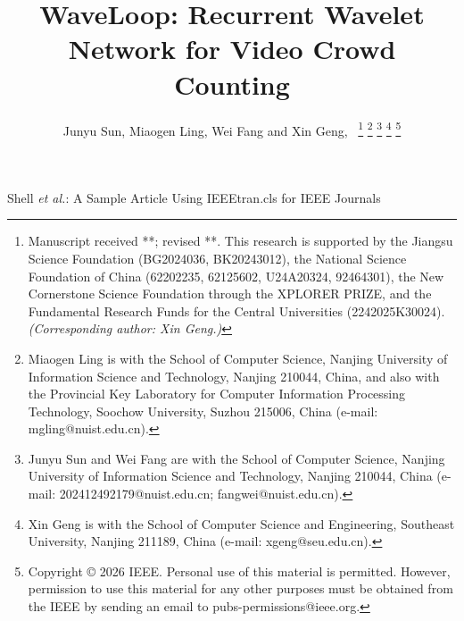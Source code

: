 \documentclass[lettersize,journal]{IEEEtran}
\begin{document}
\title{WaveLoop: Recurrent Wavelet Network for Video Crowd Counting}

\author{Junyu Sun, Miaogen Ling, Wei Fang and Xin Geng,~
\thanks{Manuscript received **; revised **. This research is supported by the Jiangsu Science Foundation (BG2024036, BK20243012), the National Science Foundation of China (62202235, 62125602, U24A20324, 92464301), the New Cornerstone Science Foundation through the XPLORER PRIZE, and the Fundamental Research Funds for the Central Universities (2242025K30024). \textit{(Corresponding author: Xin Geng.)}}
\thanks{Miaogen Ling is with the School of Computer Science, Nanjing University of Information Science and Technology, Nanjing 210044, China, and also with the Provincial Key Laboratory for Computer Information Processing Technology, Soochow University, Suzhou 215006, China (e-mail: mgling@nuist.edu.cn).}
\thanks{Junyu Sun and Wei Fang are with the School of Computer Science, Nanjing University of Information Science and Technology, Nanjing 210044, China (e-mail: 202412492179@nuist.edu.cn; fangwei@nuist.edu.cn).}
\thanks{Xin Geng is with the School of Computer Science and Engineering, Southeast University, Nanjing 211189, China (e-mail: xgeng@seu.edu.cn).}
\thanks{Copyright © 2026 IEEE. Personal use of this material is permitted. However, permission to use this material for any other purposes must be obtained from the IEEE by sending an email to pubs-permissions@ieee.org.}
}

%
{Shell \MakeLowercase{\textit{et al.}}: A Sample Article Using IEEEtran.cls for IEEE Journals}


\maketitle
\end{document}
